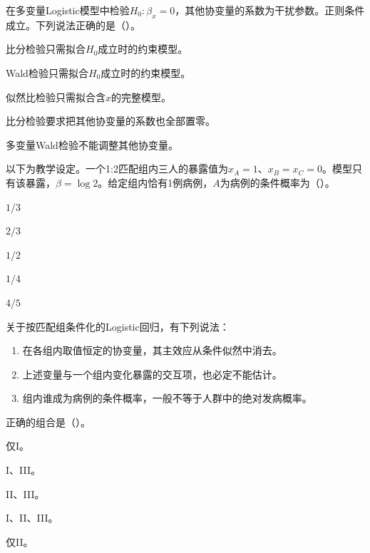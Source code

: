 \par\noindent\begin{minipage}{\linewidth}
在多变量Logistic模型中检验$H_0:\beta_x=0$，其他协变量的系数为干扰参数。正则条件成立。下列说法正确的是（\quad）。
\begin{choices}
\item 比分检验只需拟合$H_0$成立时的约束模型。
\item Wald检验只需拟合$H_0$成立时的约束模型。
\item 似然比检验只需拟合含$x$的完整模型。
\item 比分检验要求把其他协变量的系数也全部置零。
\item 多变量Wald检验不能调整其他协变量。
\end{choices}
\end{minipage}\par\medskip

\par\noindent\begin{minipage}{\linewidth}
以下为教学设定。一个1:2匹配组内三人的暴露值为$x_A=1$、$x_B=x_C=0$。模型只有该暴露，$\beta=\log2$。给定组内恰有1例病例，$A$为病例的条件概率为（\quad）。
\begin{choices}
\item $1/3$
\item $2/3$
\item $1/2$
\item $1/4$
\item $4/5$
\end{choices}
\end{minipage}\par\medskip

\par\noindent\begin{minipage}{\linewidth}
关于按匹配组条件化的Logistic回归，有下列说法：\begin{enumerate}\renewcommand{\labelenumi}{\Roman{enumi}.}\item 在各组内取值恒定的协变量，其主效应从条件似然中消去。\item 上述变量与一个组内变化暴露的交互项，也必定不能估计。\item 组内谁成为病例的条件概率，一般不等于人群中的绝对发病概率。\end{enumerate}正确的组合是（\quad）。
\begin{choices}
\item 仅I。
\item I、III。
\item II、III。
\item I、II、III。
\item 仅II。
\end{choices}
\end{minipage}\par\medskip

